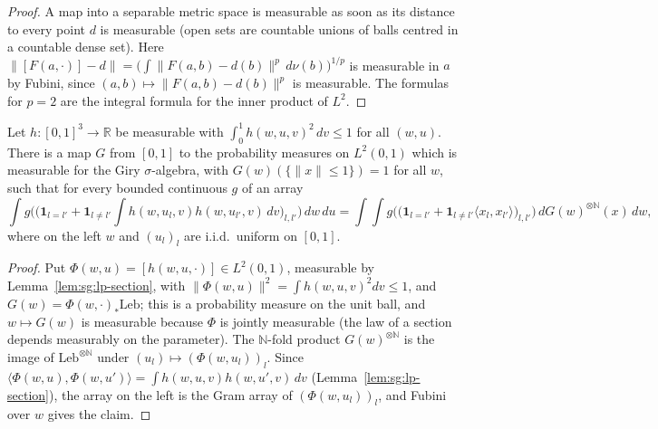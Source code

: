 \begin{proof}
  \leanok
A map into a separable metric space is measurable as soon as its distance to every point $d$ is measurable (open sets are countable unions of balls centred in a countable dense set). Here $\|[F(a,\cdot)]-d\|=\big(\int\|F(a,b)-d(b)\|^p\,d\nu(b)\big)^{1/p}$ is measurable in $a$ by Fubini, since $(a,b)\mapsto\|F(a,b)-d(b)\|^p$ is measurable. The formulas for $p=2$ are the integral formula for the inner product of $L^2$.
\end{proof}

\begin{theorem}\label{thm:sg:gibbs-representation}
  \leanok
Let $h:[0,1]^3\to\mathbb R$ be measurable with $\int_0^1h(w,u,v)^2\,dv\le1$ for all $(w,u)$. There is a map $G$ from $[0,1]$ to the probability measures on $L^2(0,1)$ which is measurable for the Giry $\sigma$-algebra, with $G(w)(\{\|x\|\le1\})=1$ for all $w$, such that for every bounded continuous $g$ of an array
\[\int g\Big(\big(\mathbf 1_{l=l'}+\mathbf 1_{l\ne l'}\textstyle\int h(w,u_l,v)h(w,u_{l'},v)\,dv\big)_{l,l'}\Big)\,dw\,du=\int\!\!\int g\Big(\big(\mathbf 1_{l=l'}+\mathbf 1_{l\ne l'}\langle x_l,x_{l'}\rangle\big)_{l,l'}\Big)\,dG(w)^{\otimes\mathbb N}(x)\,dw,\]
where on the left $w$ and $(u_l)_l$ are i.i.d.\ uniform on $[0,1]$.
\end{theorem}

\begin{proof}
  \leanok
{}
Put $\Phi(w,u)=[h(w,u,\cdot)]\in L^2(0,1)$, measurable by Lemma~\ref{lem:sg:lp-section}, with $\|\Phi(w,u)\|^2=\int h(w,u,v)^2dv\le1$, and $G(w)=\Phi(w,\cdot)_*\mathrm{Leb}$; this is a probability measure on the unit ball, and $w\mapsto G(w)$ is measurable because $\Phi$ is jointly measurable (the law of a section depends measurably on the parameter). The $\mathbb N$-fold product $G(w)^{\otimes\mathbb N}$ is the image of $\mathrm{Leb}^{\otimes\mathbb N}$ under $(u_l)\mapsto(\Phi(w,u_l))_l$. Since $\langle\Phi(w,u),\Phi(w,u')\rangle=\int h(w,u,v)h(w,u',v)\,dv$ (Lemma~\ref{lem:sg:lp-section}), the array on the left is the Gram array of $(\Phi(w,u_l))_l$, and Fubini over $w$ gives the claim.
\end{proof}

